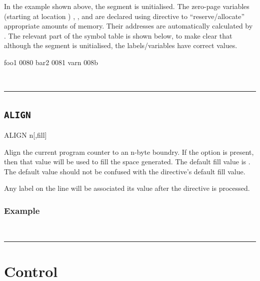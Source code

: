 In the example shown above, the  segment is unitialised. The zero-page variables (starting at location ) , , and  are declared using  directive to ``reserve/allocate'' appropriate amounts of memory. Their addresses are automatically calculated by \dasm. The relevant part of the symbol table is shown below, to make clear that although the segment is unitialised, the labels/variables have correct values.

\begin{outputx}
foo1                     0080                  
bar2                     0081                  
varn                     008b                  
\end{outputx}\\

\hrule

\subsection{\texttt{ALIGN}}
\label{pseudoop:align}

\begin{usage}
  ALIGN n[,fill]
\end{usage}

Align the current program counter to an n-byte boundry.	If the  option is present, then that value will be used to fill the space generated. The default fill value is . The  default value should not be confused with the  
directive's default fill value.

Any label on the  line will be associated its value after the directive is processed.

\subsubsection{Example}

\\

\hrule




\section{Control}


